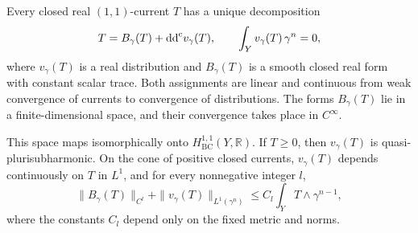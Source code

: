 \begin{lemma}\label{lem:constant-trace-bc-representative}
Every closed real $(1,1)$-current $T$ has a unique decomposition
\[
 T=B_\gamma(T)+\mathrm{dd}^{\mathrm{c}} v_\gamma(T),\qquad
 \int_Yv_\gamma(T)\,\gamma^n=0,
\]
where $v_\gamma(T)$ is a real distribution and $B_\gamma(T)$ is a smooth closed real form with constant scalar trace. Both assignments are linear and continuous from weak convergence of currents to convergence of distributions. The forms $B_\gamma(T)$ lie in a finite-dimensional space, and their convergence takes place in $C^\infty$.

This space maps isomorphically onto $H^{1,1}_{\mathrm{BC}}(Y,\mathbb R)$. If $T\geq0$, then $v_\gamma(T)$ is quasi-plurisubharmonic. On the cone of positive closed currents, $v_\gamma(T)$ depends continuously on $T$ in $L^1$, and for every nonnegative integer $l$,
\begin{equation}\label{eq:constant-trace-representative-bound}
 \|B_\gamma(T)\|_{C^l}+\|v_\gamma(T)\|_{L^1(\gamma^n)}
       \leq C_l\int_YT\wedge\gamma^{n-1},
\end{equation}
where the constants $C_l$ depend only on the fixed metric and norms.
\end{lemma}
